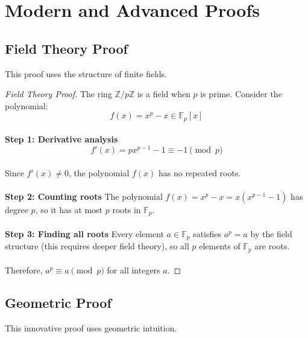 \documentclass[12pt,openany]{book}
\theoremstyle{definition}
\theoremstyle{plain}
\theoremstyle{remark}
\begin{document}
\chapter{Modern and Advanced Proofs}

\section{Field Theory Proof}

This proof uses the structure of finite fields.

\begin{proof}[Field Theory Proof]
The ring $\mathbb{Z}/p\mathbb{Z}$ is a field when $p$ is prime. Consider the polynomial:
\[
f(x) = x^p - x \in \mathbb{F}_p[x]
\]
\noindent
\\
\textbf{Step 1: Derivative analysis}
\[
f'(x) = px^{p-1} - 1 \equiv -1 \pmod{p}
\]
\noindent
\\
Since $f'(x) \neq 0$, the polynomial $f(x)$ has no repeated roots.
\noindent
\\
\\
\textbf{Step 2: Counting roots}
The polynomial $f(x) = x^p - x = x(x^{p-1} - 1)$ has degree $p$, so it has at most $p$ roots in $\mathbb{F}_p$.
\noindent
\\
\\
\textbf{Step 3: Finding all roots}
Every element $a \in \mathbb{F}_p$ satisfies $a^p = a$ by the field structure (this requires deeper field theory), so all $p$ elements of $\mathbb{F}_p$ are roots.
\noindent
\\
\\
Therefore, $a^p \equiv a \pmod{p}$ for all integers $a$.
\end{proof}

\newpage

\section{Geometric Proof}

This innovative proof uses geometric intuition.
\end{document}
